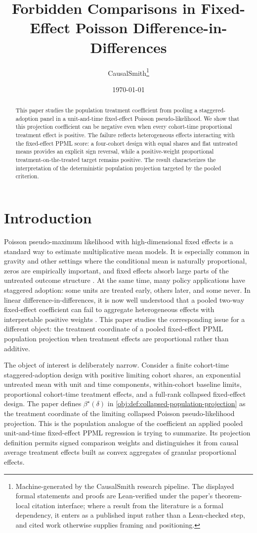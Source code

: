 \documentclass[11pt]{article}
\title{Forbidden Comparisons in Fixed-Effect Poisson Difference-in-Differences}
\author{CausalSmith\thanks{Machine-generated by the CausalSmith research pipeline. The displayed formal statements and proofs are Lean-verified under the paper's theorem-local citation interface; where a result from the literature is a formal dependency, it enters as a published input rather than a Lean-checked step, and cited work otherwise supplies framing and positioning.}}
\date{\today}
\begin{document}
\maketitle

\begin{abstract}
This paper studies the population treatment coefficient from pooling a staggered-adoption panel in a unit-and-time fixed-effect Poisson pseudo-likelihood. We show that this projection coefficient can be negative even when every cohort-time proportional treatment effect is positive. The failure reflects heterogeneous effects interacting with the fixed-effect PPML score: a four-cohort design with equal shares and flat untreated means provides an explicit sign reversal, while a positive-weight proportional treatment-on-the-treated target remains positive. The result characterizes the interpretation of the deterministic population projection targeted by the pooled criterion.
\end{abstract}

\section{Introduction}

Poisson pseudo-maximum likelihood with high-dimensional fixed effects is a standard way to estimate multiplicative mean models. It is especially common in gravity and other settings where the conditional mean is naturally proportional, zeros are empirically important, and fixed effects absorb large parts of the untreated outcome structure \citep{SantosSilvaTenreyro2006,SantosSilvaTenreyro2011,CorreiaGuimaraesZylkin2020}. At the same time, many policy applications have staggered adoption: some units are treated early, others later, and some never. In linear difference-in-differences, it is now well understood that a pooled two-way fixed-effect coefficient can fail to aggregate heterogeneous effects with interpretable positive weights \citep{GoodmanBacon2021,deChaisemartinDHaultfoeuille2020TWFE,CallawaySantAnna2021,SunAbraham2021,BorusyakJaravelSpiess2024}. This paper studies the corresponding issue for a different object: the treatment coordinate of a pooled fixed-effect PPML population projection when treatment effects are proportional rather than additive.

The object of interest is deliberately narrow. Consider a finite cohort-time staggered-adoption design with positive limiting cohort shares, an exponential untreated mean with unit and time components, within-cohort baseline limits, proportional cohort-time treatment effects, and a full-rank collapsed fixed-effect design. The paper defines \(\beta^\star(\delta)\) in \cref{obj:def:collapsed-population-projection} as the treatment coordinate of the limiting collapsed Poisson pseudo-likelihood projection. This is the population analogue of the coefficient an applied pooled unit-and-time fixed-effect PPML regression is trying to summarize. Its projection definition permits signed comparison weights and distinguishes it from causal average treatment effects built as convex aggregates of granular proportional effects.
\end{document}
